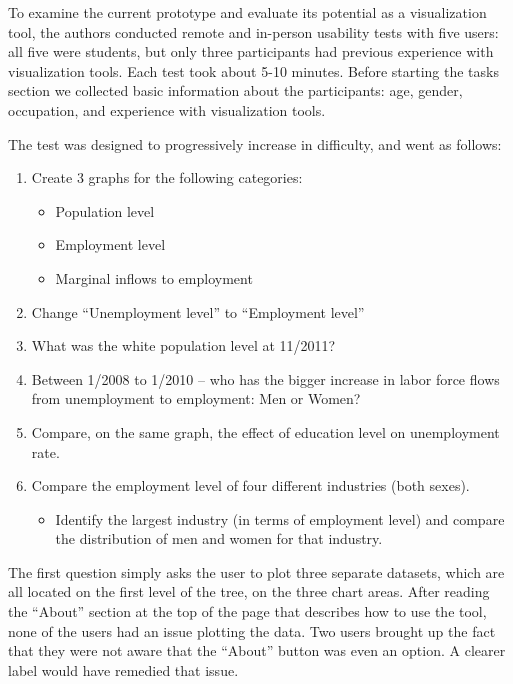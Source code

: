 \documentclass{sigchi}
\newcommand\Peter[1]{{\color{red}#1}}	%
\begin{document}
\Peter{To examine the current prototype and evaluate its potential as a visualization tool, the authors conducted remote and in-person usability tests with five users: all five were students, but only three participants had previous experience with visualization tools. Each test took about 5-10 minutes. Before starting the tasks section we collected basic information about the participants: age, gender, occupation, and experience with visualization tools.

The test was designed to progressively increase in difficulty, and went as follows:

\begin{enumerate}
  \item Create 3 graphs for the following categories:

\begin{itemize}
  \item Population level
  \item Employment level
  \item Marginal inflows to employment
\end{itemize}

  \item Change ``Unemployment level'' to ``Employment level''
  \item What was the white population level at 11/2011?
  \item Between 1/2008 to 1/2010 – who has the bigger increase in labor force flows from unemployment to employment: Men or Women?
  \item Compare, on the same graph, the effect of education level on unemployment rate.
  \item Compare the employment level of four different industries (both sexes).
\begin{itemize}
  \item Identify the largest industry (in terms of employment level) and compare the distribution of men and women for that industry.
\end{itemize}

\end{enumerate}

The first question simply asks the user to plot three separate datasets, which are all located on the first level of the tree, on the three chart areas. After reading the ``About'' section at the top of the page that describes how to use the tool, none of the users had an issue plotting the data. Two users brought up the fact that they were not aware that the ``About'' button was even an option. A clearer label would have remedied that issue.

}
\end{document}
